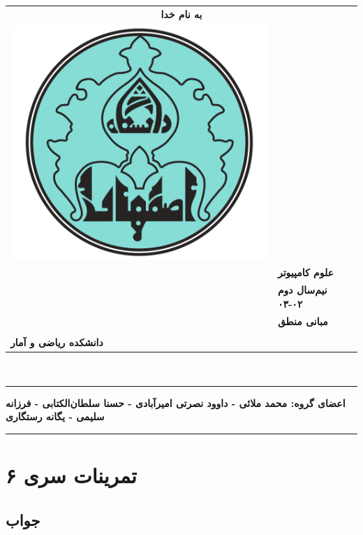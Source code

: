 \documentclass[]{exam}
\begin{document}
\pagestyle{head}
\firstpageheader{}{}{}
\runningheadrule
\begin{tabular}{p{} l}
\multicolumn{2}{c}{\textbf{به نام خدا}}\\
\multirow{2}{*}{\includegraphics[scale=0.2] {UILOGO.png}} & \\ \\
&  \textbf{علوم کامپیوتر}\\
&  \textbf{نیم‌سال دوم ۰۲-۰۳}\\
&  \textbf{مبانی منطق}\\ \\
 \textbf{دانشکده ریاضی و آمار} &  \\
\end{tabular}\\

\rule[1ex]{\textwidth}{.1pt}
\textbf{
    اعضای گروه: 
    محمد ملائی - داوود نصرتی امیرآبادی - 
    حسنا سلطان‌الکتابی - فرزانه سلیمی - یگانه رستگاری
}


\rule[1ex]{\textwidth}{.1pt}
\vspace{0pt}

\section*{تمرینات سری ۶}

\subsection*{جواب}

\end{document}

